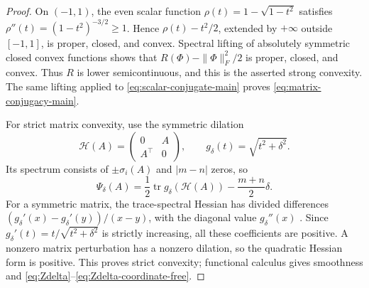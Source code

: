 \begin{proof}
On \((-1,1)\), the even scalar function
\(\rho(t)=1-\sqrt{1-t^2}\) satisfies
\(\rho''(t)=(1-t^2)^{-3/2}\ge1\).  Hence
\(\rho(t)-t^2/2\), extended by \(+\infty\) outside \([-1,1]\), is proper,
closed, and convex.  Spectral lifting of absolutely symmetric closed convex functions
\citep{lewis1995convex} shows that
\(R(\Phi)-\|\Phi\|_F^2/2\) is proper, closed, and convex.  Thus \(R\) is
lower semicontinuous, and this is the asserted strong convexity.
The same lifting applied to \eqref{eq:scalar-conjugate-main} proves
\eqref{eq:matrix-conjugacy-main}.

For strict matrix convexity, use the symmetric dilation
\[
 \mathcal H(A)=\begin{pmatrix}0&A\\A^\top&0\end{pmatrix},
 \qquad g_\delta(t)=\sqrt{t^2+\delta^2}.
\]
Its spectrum consists of \(\pm\sigma_i(A)\) and \(|m-n|\) zeros, so
\[
 \Psi_\delta(A)
 =\frac12\operatorname{tr}g_\delta(\mathcal H(A))
 -\frac{m+n}{2}\delta.
\]
For a symmetric matrix, the trace-spectral Hessian has divided differences
\((g_\delta'(x)-g_\delta'(y))/(x-y)\), with the diagonal value
\(g_\delta''(x)\) \citep{lewis2001twice}.  Since
\(g_\delta'(t)=t/\sqrt{t^2+\delta^2}\) is strictly increasing, all these
coefficients are positive.  A nonzero matrix perturbation has a nonzero
dilation, so the quadratic Hessian form is positive.  This proves strict
convexity; functional calculus gives smoothness and
\eqref{eq:Zdelta}--\eqref{eq:Zdelta-coordinate-free}.
\end{proof}

